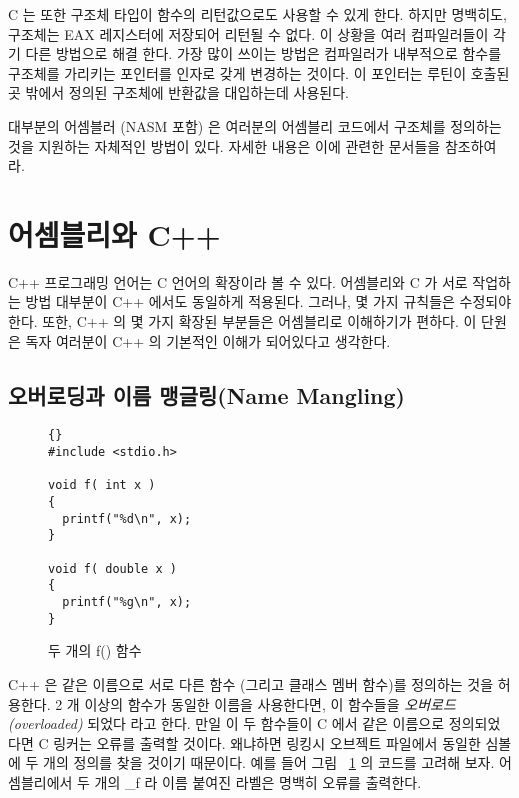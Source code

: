 C 는 또한 구조체 타입이 함수의 리턴값으로도 사용할 수 있게 한다. 하지만 명백히도, 구조체는
{\code EAX} 레지스터에 저장되어 리턴될 수 없다. 이 상황을 여러 컴파일러들이 각기 다른 방법으로 해결 한다.
가장 많이 쓰이는 방법은 컴파일러가 내부적으로 함수를 구조체를 가리키는 포인터를 인자로 갖게
변경하는 것이다. 이 포인터는 루틴이 호출된 곳 밖에서 정의된 구조체에 반환값을 대입하는데 사용된다. 

대부분의 어셈블러 (NASM 포함) 은 여러분의 어셈블리 코드에서 구조체를 정의하는 것을 지원하는
자체적인 방법이 있다. 자세한 내용은 이에 관련한 문서들을 참조하여라. 


\section{어셈블리와 C++}

C++ 프로그래밍 언어는 C 언어의 확장이라 볼 수 있다. 어셈블리와 C 가 서로
작업하는 방법 대부분이 C++ 에서도 동일하게 적용된다. 그러나, 몇 가지 규칙들은
수정되야 한다. 또한, C++ 의 몇 가지 확장된 부분들은 어셈블리로 이해하기가 편하다. 
이 단원은 독자 여러분이 C++ 의 기본적인 이해가 되어있다고 생각한다. 

\subsection{오버로딩과 이름 맹글링(Name Mangling)}
\label{subsec:mangling}
\begin{figure}
\centering
\begin{lstlisting}[frame=tlrb]{}
#include <stdio.h>

void f( int x )
{
  printf("%d\n", x);
}

void f( double x )
{
  printf("%g\n", x);
}
\end{lstlisting}
\caption{두 개의 {\code f()} 함수 \label{fig:twof}}
\end{figure}

C++ 은 같은 이름으로 서로 다른 함수 (그리고 클래스 멤버 함수)를 정의하는 것을 허용한다.
2 개 이상의 함수가 동일한 이름을 사용한다면, 이 함수들을 \emph{오버로드(overloaded)} 되었다
라고 한다. 만일 이 두 함수들이 C 에서 같은 이름으로 정의되었다면 C 링커는 오류를 출력할 것이다. 왜냐하면
링킹시 오브젝트 파일에서 동일한 심볼에 두 개의 정의를 찾을 것이기 때문이다. 예를 들어 그림 ~\ref{fig:twof} 의
코드를 고려해 보자. 어셈블리에서 두 개의 {\code \_f} 라 이름 붙여진 라벨은 명백히 오류를 출력한다. 

